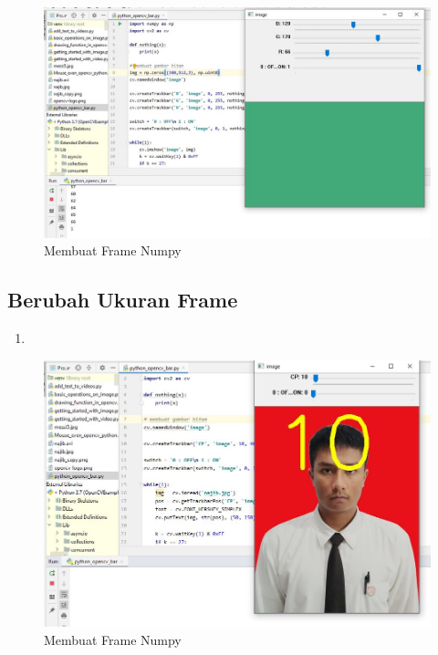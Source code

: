 \begin{figure}[ht]
\centering
\includegraphics[scale=0.5]{figures/2,32,1.jpg}
\caption{Membuat Frame Numpy}
\label{contoh}
\end{figure}



\newpage
\subsection{Berubah Ukuran Frame}

\begin{enumerate}
	\item
\end{enumerate}

\begin{figure}[ht]
\centering
\includegraphics[scale=0.5]{figures/2,33.jpg}
\caption{Membuat Frame Numpy}
\label{contoh}
\end{figure}

